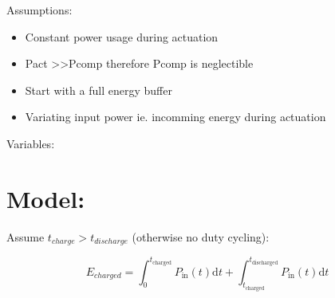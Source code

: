 \documentclass[11pt,twoside,a4paper]{article}
\begin{document}



Assumptions: \ 
\begin{itemize}
\item Constant power usage during actuation
\item Pact \textgreater\textgreater\phantom Pcomp therefore Pcomp is neglectible
\item Start with a full energy buffer
\item Variating input power ie. incomming energy during actuation
\end{itemize}


Variables: \\

\section{Model:}


Assume $t_{charge} > t_{discharge}$ (otherwise no duty cycling): 

\begin{equation}
E_{charged} = \int_{0}^{t_{\text{charged}}} P_{\text{in}}(t) \mathrm{d}t + \int_{t_{\text{charged}}}^{t_{\text{discharged}}} P_{\text{in}}(t)  \mathrm{d}t
\end{equation}



\end{document}
